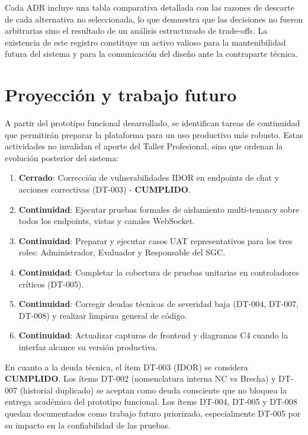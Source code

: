 \documentclass[final]{udpthesis}
\begin{document}
Cada ADR incluye una tabla comparativa detallada con las razones de descarte de cada alternativa no seleccionada, lo que demuestra que las decisiones no fueron arbitrarias sino el resultado de un análisis estructurado de trade-offs. La existencia de este registro constituye un activo valioso para la mantenibilidad futura del sistema y para la comunicación del diseño ante la contraparte técnica.

\chapter{Proyección y trabajo futuro}

A partir del prototipo funcional desarrollado, se identifican tareas de continuidad que permitirán preparar la plataforma para un uso productivo más robusto. Estas actividades no invalidan el aporte del Taller Profesional, sino que ordenan la evolución posterior del sistema:

\begin{enumerate}
    \item \textbf{Cerrado}: Corrección de vulnerabilidades IDOR en endpoints de chat y acciones correctivas (DT-003) - \textbf{CUMPLIDO}.
    \item \textbf{Continuidad}: Ejecutar pruebas formales de aislamiento multi-tenancy sobre todos los endpoints, vistas y canales WebSocket.
    \item \textbf{Continuidad}: Preparar y ejecutar casos UAT representativos para los tres roles: Administrador, Evaluador y Responsable del SGC.
    \item \textbf{Continuidad}: Completar la cobertura de pruebas unitarias en controladores críticos (DT-005).
    \item \textbf{Continuidad}: Corregir deudas técnicas de severidad baja (DT-004, DT-007, DT-008) y realizar limpieza general de código.
    \item \textbf{Continuidad}: Actualizar capturas de frontend y diagramas C4 cuando la interfaz alcance su versión productiva.
\end{enumerate}

En cuanto a la deuda técnica, el ítem DT-003 (IDOR) se considera \textbf{CUMPLIDO}. Los ítems DT-002 (nomenclatura interna NC vs Brecha) y DT-007 (historial duplicado) se aceptan como deuda consciente que no bloquea la entrega académica del prototipo funcional. Los ítems DT-004, DT-005 y DT-008 quedan documentados como trabajo futuro priorizado, especialmente DT-005 por su impacto en la confiabilidad de las pruebas.
\end{document}
